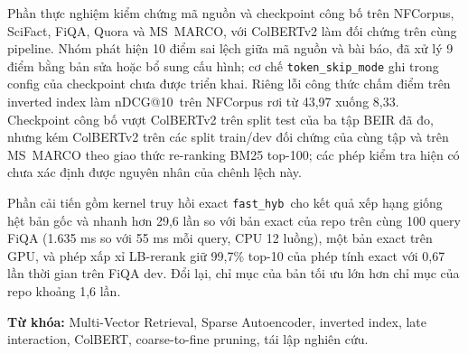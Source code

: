 \documentclass[a4paper,13pt]{extreport}
\makeatletter
\theoremstyle{plain}
\newcommand{\ndcg}{nDCG@10}
\newcommand{\fasthyb}{\texttt{fast\_hyb}}
\makeatother
\begin{document}
Phần thực nghiệm kiểm chứng mã nguồn và checkpoint công bố trên NFCorpus, SciFact, FiQA, Quora và MS~MARCO, với ColBERTv2 làm đối chứng trên cùng pipeline. Nhóm phát hiện 10 điểm sai lệch giữa mã nguồn và bài báo, đã xử lý 9 điểm bằng bản sửa hoặc bổ sung cấu hình; cơ chế \texttt{token\_skip\_mode} ghi trong config của checkpoint chưa được triển khai. Riêng lỗi công thức chấm điểm trên inverted index làm \ndcg\ trên NFCorpus rơi từ 43,97 xuống 8,33. Checkpoint công bố vượt ColBERTv2 trên split test của ba tập BEIR đã đo, nhưng kém ColBERTv2 trên các split train/dev đối chứng của cùng tập và trên MS~MARCO theo giao thức re-ranking BM25 top-100; các phép kiểm tra hiện có chưa xác định được nguyên nhân của chênh lệch này.

Phần cải tiến gồm kernel truy hồi exact \fasthyb\ cho kết quả xếp hạng giống hệt bản gốc và nhanh hơn 29,6 lần so với bản exact của repo trên cùng 100 query FiQA (1.635 ms so với 55 ms mỗi query, CPU 12 luồng), một bản exact trên GPU, và phép xấp xỉ LB-rerank giữ 99,7\% top-10 của phép tính exact với 0,67 lần thời gian trên FiQA dev. Đổi lại, chỉ mục của bản tối ưu lớn hơn chỉ mục của repo khoảng 1,6 lần.

\medskip
\noindent\textbf{Từ khóa:} Multi-Vector Retrieval, Sparse Autoencoder, inverted index, late interaction, ColBERT, coarse-to-fine pruning, tái lập nghiên cứu.

\clearpage
\tableofcontents
\clearpage
\listoffigures
\listoftables
\clearpage
\end{document}
